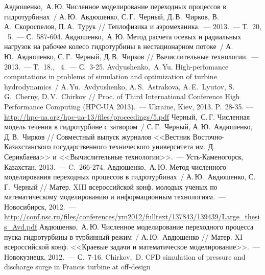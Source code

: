 \begin{thebibliography}{999}
\Rus
{}  Авдюшенко,~А.\,Ю. Численное моделирование переходных процессов в гидротурбинах~/ 
               А.\,Ю.~Авдюшенко, С.\,Г.~Черный, Д.\,В.~Чирков, В.\,А.~Скороспелов, П.\,А.~Турук // 
               Теплофизика и аэромеханика.~--- 2013.~--- Т.~20, \No~5.~--- С.~587-604.
\Rus
{} Авдюшенко,~А.\,Ю. Метод расчета осевых и радиальных нагрузок на 
              рабочее колесо гидротурбины в нестационарном потоке~/ А.\,Ю.~Авдюшенко, С.\,Г.~Черный, 
              Д.\,В.~Чирков // Вычислительные технологии.~--- 2013.~--- Т.~18., \No~4.~--- С.~3-25.
\Eng
{} Avdyushenko,~A.\,Yu. High-perfomance computations in problems of simulation and optimization of 
              turbine hydrodynamics~/ A.\,Yu.~Avdyushenko, A.\,S.~Astrakova, A.\,E.~Lyutov, S.\,G.~Cherny, 
              D.\,V.~Chirkov // Proc. of Third International Conference 
              High Performance Computing (HPC-UA 2013).~--- Ukraine, Kiev, 2013. P.~28-35. --- 
              \href{http://hpc-ua.org/hpc-ua-13/files/proceedings/5.pdf}
              {http://hpc-ua.org/hpc-ua-13/files/proceedings/5.pdf}
\Rus
{} Черный,~С.\,Г. Численная модель течения в гидротурбине с затвором~/ С.\,Г.~Черный, 
              А.\,Ю.~Авдюшенко, Д.\,В.~Чирков // Совместный выпуск журналов <<Вестник 
              Восточно-Казахстанского государственного технического университета им. Д. Серикбаева>> 
              и <<Вычислительные технологии>>.~--- Усть-Каменогорск, Казахстан, 2013.~--- C.~266-274.
\Rus
{} Авдюшенко,~А.\,Ю. Метод численного моделирования переходных 
              процессов в гидротурбинах~/ А.\,Ю.~Авдюшенко, С.\,Г.~Черный // 
              Матер. XIII всероссийской конф. молодых ученых по математическому моделированию и информационным 
              технологиям.~--- Новосибирск, 2012.~--- 
              \href{http://conf.nsc.ru/files/conferences/ym2012/fulltext/137843/139439/Large_thesis_Avd.pdf}
              {http://conf.nsc.ru/files/conferences/ym2012/fulltext/137843\linebreak[1]/139439/Large\_thesis\_Avd.pdf}
\Rus
{} Авдюшенко,~А.\,Ю. Численное моделирование переходного процесса пуска 
              гидротурбины в турбинный режим~/ А.\,Ю.~Авдюшенко // 
              Матер. XI всероссийской конф. <<Краевые задачи и математическое моделирование>>.~--- 
              Новокузнецк, 2012.~--- С.~7-16.
\Eng
{} Chirkov,~D. CFD simulation of pressure and discharge surge in Francis turbine at off-design 

\end{thebibliography}
